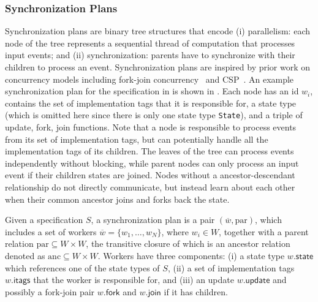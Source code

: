 \subsubsection{Synchronization Plans}
\label{ssec:distributed-configurations}

Synchronization plans are binary tree structures that encode (i)
parallelism: each node of the tree represents a sequential thread of
computation that processes input events; and (ii) synchronization:
parents have to synchronize with their children to process an event.
Synchronization plans are inspired by prior work on concurrency
models including fork-join concurrency~\cite{frigo1998implementation,lea2000java} and
CSP~\cite{hoare1978communicating}. An example synchronization plan for
the specification in  is shown in
.  Each node has an id $w_i$, contains
the set of implementation tags that it is responsible for, a state
type (which is omitted here since there is only one state type
\texttt{State}), and a triple of update, fork, join functions.
Note that a node is responsible to process events from its set of
implementation tags, but can potentially handle all the implementation
tags of its children. The leaves of the tree can process events
independently without blocking, while parent nodes can only process an
input event if their children states are joined. Nodes without a
ancestor-descendant relationship do not directly communicate, but
instead learn about each other when their common ancestor
joins and forks back the state.

\newcommand{\wfield}[2]{{#1}.{\mathsf{#2}}}

\begin{definition}
  Given a specification $S$,
  a synchronization plan is a pair $(\overline{w}, \mathrm{par})$, 
  which includes a set of workers $\overline{w} = \{ w_1, \ldots, w_N \}$,
  where $w_i \in W$, 
  together with a parent relation $\mathrm{par} \subseteq W \times W$, 
    the transitive closure of which is an ancestor relation denoted as
    $\mathrm{anc} \subseteq W \times W$.
  Workers have three components:
    (i) a state type $\wfield{w}{state}$ which references one of the state types of $S$,
    (ii) a set of implementation tags $\wfield{w}{itags}$ that the worker is responsible for,
    and (iii) an update $\wfield{w}{update}$ and possibly a fork-join pair $\wfield{w}{fork}$ and $\wfield{w}{join}$ if it has children.
\end{definition}

